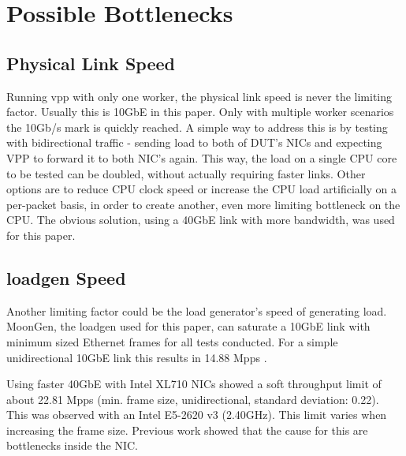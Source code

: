 \section{Possible Bottlenecks}

\subsection{Physical Link Speed}
\label{sec:linkspeed}


Running \Ac{vpp} with only one worker, the physical link speed is never
the limiting factor. Usually this is 10GbE in this paper. Only with
multiple worker scenarios the 10Gb/s mark is quickly reached. A simple
way to address this is by testing with bidirectional traffic - sending
load to both of DUT's NICs and expecting VPP to forward it to both
NIC's again. This way, the load on a single CPU core to be tested can
be doubled, without actually requiring faster links. Other options are
to reduce CPU clock speed or increase the CPU load artificially on a
per-packet basis, in order to create another, even more limiting
bottleneck on the CPU. The obvious solution, using a 40GbE link with
more bandwidth, was used for this paper.


\subsection{\Ac{loadgen} Speed}


Another limiting factor could be the load generator's speed of
generating load. MoonGen, the \Ac{loadgen} used for this paper, can
saturate a 10GbE link with minimum sized Ethernet frames for all tests
conducted. For a simple unidirectional 10GbE link this results in
14.88 Mpps \cite{emmerich2015assessing}.


\label{sec:40gbelimit}

Using faster 40GbE with Intel XL710 NICs showed a soft throughput
limit of about 22.81 Mpps (min. frame size, unidirectional, standard
deviation: 0.22). This was observed with an Intel E5-2620 v3
(2.40GHz). This limit varies when increasing the frame size. Previous
work showed that the cause for this are bottlenecks inside the NIC.
\cite{emmerich2015moongen}

